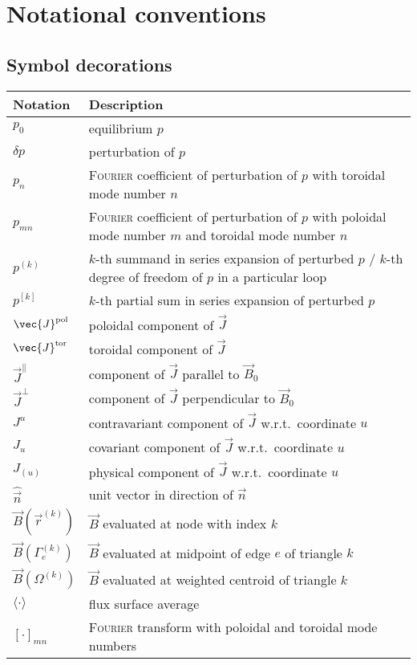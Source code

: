\section{Notational conventions}

\setglossarypreamble[main]{\label{tab:symbols}}

\printglossary[type=main, title={Base symbols}]

\subsection{Symbol decorations}
\label{tab:decorations}

\begin{longtable*}{l >{\RaggedRight}p{0.8\textwidth}}
  \toprule
  \textbf{Notation} & \textbf{Description} \\
  \midrule
  \endhead
  $p_{0}$ & equilibrium $p$ \\
  $\delta p$ & perturbation of $p$ \\
  $p_{n}$ & \textsc{Fourier} coefficient of perturbation of $p$ with toroidal mode number $n$ \\
  $p_{m n}$ & \textsc{Fourier} coefficient of perturbation of $p$ with poloidal mode number $m$ and toroidal mode number $n$ \\
  $p^{(k)}$ & $k$-th summand in series expansion of perturbed $p$ / $k$-th degree of freedom of $p$ in a particular loop \\
  $p^{[k]}$ & $k$-th partial sum in series expansion of perturbed $p$ \\
  \midrule
  $\vec{J}^{\pol}$ & poloidal component of $\vec{J}$ \\
  $\vec{J}^{\tor}$ & toroidal component of $\vec{J}$ \\
  $\vec{J}^{\parallel}$ & component of $\vec{J}$ parallel to $\vec{B}_{0}$ \\
  $\vec{J}^{\perp}$ & component of $\vec{J}$ perpendicular to $\vec{B}_{0}$ \\
  $J^{u}$ & contravariant component of $\vec{J}$ w.r.t.\ coordinate $u$ \\
  $J_{u}$ & covariant component of $\vec{J}$ w.r.t.\ coordinate $u$ \\
  $J_{(u)}$ & physical component of $\vec{J}$ w.r.t.\ coordinate $u$ \\
  $\hat{\vec{n}}$ & unit vector in direction of $\vec{n}$ \\
  \midrule
  $\vec{B} (\vec{r}^{(k)})$ & $\vec{B}$ evaluated at node with index $k$ \\
  $\vec{B} (\Gamma_{e}^{(k)})$ & $\vec{B}$ evaluated at midpoint of edge $e$ of triangle $k$ \\
  $\vec{B} (\Omega^{(k)})$ & $\vec{B}$ evaluated at weighted centroid of triangle $k$ \\
  \midrule
  $\langle \cdot \rangle$ & flux surface average \\
  $[ \cdot ]_{m n}$ & \textsc{Fourier} transform with poloidal and toroidal mode numbers \\
  \bottomrule
\end{longtable*}

